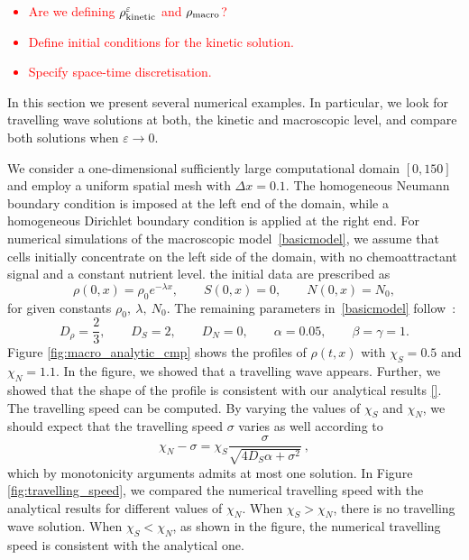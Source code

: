 \documentclass[11pt,twoside]{article}
\theoremstyle{nonumberplain}
\begin{document}
{\textcolor{red}
{\begin{itemize}
    \item Are we defining $\rho^\varepsilon_{\textnormal{kinetic}}$ and $\rho_{\textnormal{macro}}$?
    \item Define initial conditions for the kinetic solution.
    \item Specify space-time discretisation.
\end{itemize}
}

In this section we present several numerical examples. In particular, we look for travelling wave solutions at both, the kinetic and macroscopic level, and compare both solutions when $\varepsilon\to 0$.

We consider a one-dimensional sufficiently large computational domain $[0,150]$ and employ a uniform spatial mesh with $\Delta x = 0.1$.
The homogeneous Neumann boundary condition is imposed at the left end of the domain, while a homogeneous Dirichlet boundary condition is applied at the right end.
For numerical simulations of the macroscopic model~\eqref{basicmodel}, 
we assume that cells initially concentrate on the left side of the domain,
with no chemoattractant signal and a constant nutrient level.  
the initial data are prescribed as
\[
\rho(0,x) = \rho_0 e^{-\lambda x},\qquad 
S(0,x) = 0,\qquad 
N(0,x) = N_0,
\]
for given constants $\rho_0,\ \lambda,\ N_0$.  
The remaining parameters in~\eqref{basicmodel} follow~\cite{saragosti2010mathematical}:
\[
D_\rho = \frac23,\qquad  
D_S = 2,\qquad 
D_N = 0,\qquad 
\alpha = 0.05,\qquad 
\beta = \gamma = 1.
\]
Figure \ref{fig:macro_analytic_cmp} shows the profiles of $\rho(t,x)$ with $\chi_S = 0.5$ and $\chi_N = 1.1$. 
In the figure, we showed that a travelling wave appears. 
Further, we showed that the shape of the profile is consistent with our analytical results \eqref{}. 
The travelling speed can be computed. 
By varying the values of $\chi_S$ and $\chi_N$, we should expect that the travelling speed $\sigma$ varies as well according to
$$
    \chi_N - \sigma = \chi_S \frac{\sigma}{\sqrt{4D_S\alpha + \sigma^2}}\ ,
$$
which by monotonicity arguments admits at most one solution. 
In Figure \ref{fig:travelling_speed}, we compared the numerical travelling speed with the analytical results for different values of $\chi_N$. 
When $\chi_S > \chi_N$, there is no travelling wave solution. When $\chi_S < \chi_N$, as shown in the figure, the numerical travelling speed is consistent with the analytical one. 



}
\end{document}
